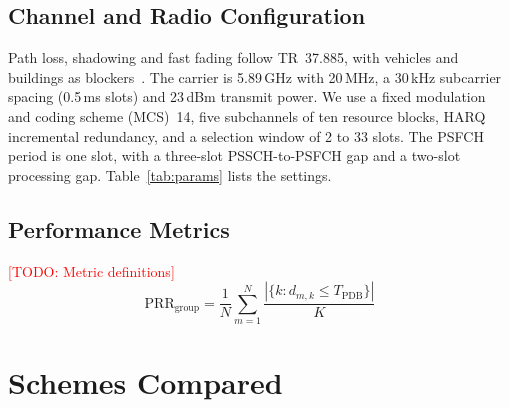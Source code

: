 \documentclass[conference]{IEEEtran}
\newcommand{\todo}[1]{\textcolor{red}{[TODO: #1]}}
\begin{document}
\subsection{Channel and Radio Configuration}
Path loss, shadowing and fast fading follow TR~37.885, with vehicles and buildings as
blockers~\cite{3gpp_tr37885}. The carrier is 5.89\,GHz with 20\,MHz, a 30\,kHz subcarrier spacing
(0.5\,ms slots) and 23\,dBm transmit power. We use a fixed modulation and coding scheme (MCS)~14, five
subchannels of ten resource blocks, HARQ incremental redundancy, and a selection window of 2 to 33
slots. The PSFCH period is one slot, with a three-slot PSSCH-to-PSFCH gap and a two-slot processing gap.
Table~\ref{tab:params} lists the settings.

\subsection{Performance Metrics}
\todo{Metric definitions}
\begin{equation}
  \mathrm{PRR}_{\text{group}} = \frac{1}{N}\sum_{m=1}^{N}\frac{|\{k : d_{m,k}\le T_{\text{PDB}}\}|}{K}
  \label{eq:prr}
\end{equation}

\section{Schemes Compared}\label{sec:schemes}
\end{document}
